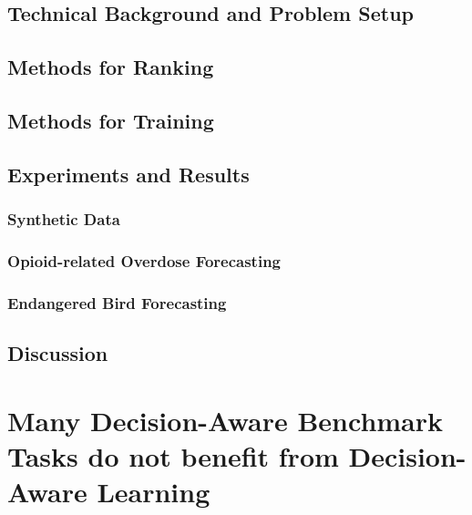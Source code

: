 \documentclass[11pt,final,letterpaper,openany]{mytuftsthesis}
\begin{document}
\section{Technical Background and Problem Setup}
\label{sec:background}


\section{Methods for Ranking}
\label{sec:methods_rank}


\section{Methods for Training}
\label{sec:methods_train}


\section{Experiments and Results}
\label{sec:results}


\subsection{Synthetic Data}
\label{sec:results_synth1D}



\subsection{Opioid-related Overdose Forecasting}
\label{sec:results_opioid}


\subsection{Endangered Bird Forecasting}
\label{sec:results_birds}


\section{Discussion}
\label{sec:discussion}

\graphicspath{{./}}

\chapter{Many Decision-Aware Benchmark Tasks do not benefit from Decision-Aware Learning}
\label{chap:dpo}
\graphicspath{{content/chapters/dpo/}}
\end{document}
